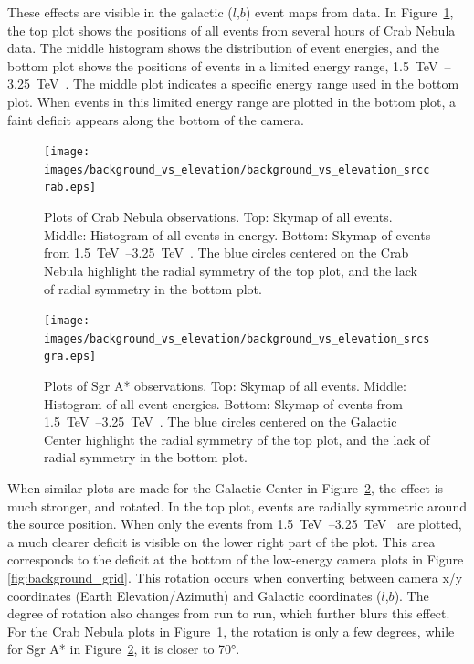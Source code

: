     These effects are visible in the galactic ($l$,$b$) event maps from data.
    In Figure~\ref{fig:bkgvsel_crab}, the top plot shows the positions of all events from several hours of Crab Nebula data.
    The middle histogram shows the distribution of event energies, and the bottom plot shows the positions of events in a limited energy range, \SIrange{1.5}{3.25}{\TeV{}}.
    The middle plot indicates a specific energy range used in the bottom plot.
    When events in this limited energy range are plotted in the bottom plot, a faint deficit appears along the bottom of the camera.
    
    \begin{figure}[!p]
      \centering
      \texttt{[image: images/background\_vs\_elevation/background\_vs\_elevation\_srccrab.eps]}
      \caption[Background Vs Elevation Crab Nebula]
      {\small 
        Plots of Crab Nebula observations.
        Top: Skymap of all events.
        Middle: Histogram of all events in energy.
        Bottom: Skymap of events from \SIrange{1.5}{3.25}{\TeV{}}.  
        The blue circles centered on the Crab Nebula highlight the radial symmetry of the top plot, and the lack of radial symmetry in the bottom plot.
      }
      \label{fig:bkgvsel_crab}
    \end{figure}
    
    \begin{figure}[!p]
      \centering
      \texttt{[image: images/background\_vs\_elevation/background\_vs\_elevation\_srcsgra.eps]}
      \caption[Background Vs Elevation Sgr A*]
      {\small 
        Plots of Sgr A* observations.
        Top: Skymap of all events.
        Middle: Histogram of all event energies.
        Bottom: Skymap of events from \SIrange{1.5}{3.25}{\TeV{}}.  
        The blue circles centered on the Galactic Center highlight the radial symmetry of the top plot, and the lack of radial symmetry in the bottom plot.
      }
      \label{fig:bkgvsel_sgra}
    \end{figure}
    
    When similar plots are made for the Galactic Center in Figure~\ref{fig:bkgvsel_sgra}, the effect is much stronger, and rotated.
    In the top plot, events are radially symmetric around the source position.
    When only the events from \SIrange{1.5}{3.25}{\TeV{}} are plotted, a much clearer deficit is visible on the lower right part of the plot.
    This area corresponds to the deficit at the bottom of the low-energy camera plots in Figure \ref{fig:background_grid}.
    This rotation occurs when converting between camera x/y coordinates (Earth Elevation/Azimuth) and Galactic coordinates ($l$,$b$).
    The degree of rotation also changes from run to run, which further blurs this effect.
    For the Crab Nebula plots in Figure~\ref{fig:bkgvsel_crab}, the rotation is only a few degrees, while for Sgr A* in Figure~\ref{fig:bkgvsel_sgra}, it is closer to \ang{70}.
    
